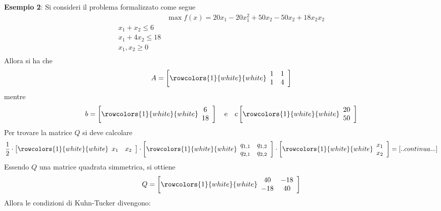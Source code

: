 \documentclass[a4paper]{extarticle}
\begin{document}
\vspace{1em}
\noindent
\textbf{Esempio 2}: Si consideri il problema formalizzato come segue
\begin{align*}
    &\max f(x) = 20 x_1 - 20 x_1^2 + 50x_2 - 50 x_2 + 18 x_2 x_2\\
    x_1 + x_2 \leq 6\\
    x_1 + 4x_2 \leq 18\\
    x_1, x_2 \geq 0\\
\end{align*}
Allora si ha che
\[A = \left[
    \rowcolors{1}{white}{white}
    \begin{array}{cc}
        1 & 1\\
        1 & 4\\
    \end{array}
\right]
\]
mentre
\[b = \left[
    \rowcolors{1}{white}{white}
    \begin{array}{cc}
        6\\
        18
    \end{array}
\right] \hspace{1em} \text{e} \hspace{1em} c\left[
    \rowcolors{1}{white}{white}
    \begin{array}{cc}
        20\\
        50
    \end{array}
\right]\]
Per trovare la matrice $Q$ si deve calcolare
\[\dfrac{1}{2} \cdot \left[
    \rowcolors{1}{white}{white}
    \begin{array}{cc}
        x_1 & x_2\\
    \end{array}
\right] \cdot \left[
    \rowcolors{1}{white}{white}
    \begin{array}{cc}
        q_{1,1} & q_{1,2}\\
        q_{2,1} & q_{2,2}\\
    \end{array}
\right] \cdot \left[
    \rowcolors{1}{white}{white}
    \begin{array}{cc}
        x_1\\
        x_2
    \end{array}
\right] = [..continua...]\]
Essendo $Q$ una matrice quadrata simmetrica, si ottiene
\[Q=\left[
    \rowcolors{1}{white}{white}
    \begin{array}{cc}
        40  & -18\\
        -18 & 40
    \end{array}
\right]\]
Allora le condizioni di Kuhn-Tucker divengono:
\end{document}
